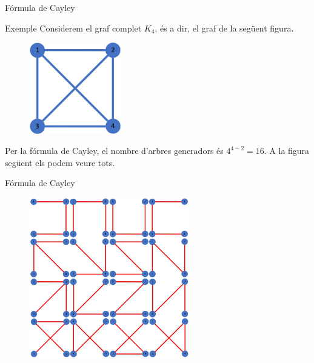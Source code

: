 \documentclass{beamer}
\begin{document}
\begin{frame}{Fórmula de Cayley}
\begin{exampleblock}{Exemple}
  Considerem el graf complet $K_4$, és a dir, el graf de la següent figura.
\begin{figure}[ht]
\centering
\includegraphics[width=4cm]{imatges/graf2.jpg}
\end{figure}\pause 
 Per la fórmula de Cayley, el nombre d'arbres generadors és $4^{4-2} = 16$. A la figura següent els podem veure tots.
\end{exampleblock}
\end{frame}
\begin{frame}{Fórmula de Cayley}
\begin{exampleblock}{}
  \begin{figure}[ht]
\centering
\includegraphics[width=7cm]{imatges/graf2_16.jpg}
\end{figure}
\end{exampleblock}
\end{frame}
\end{document}
